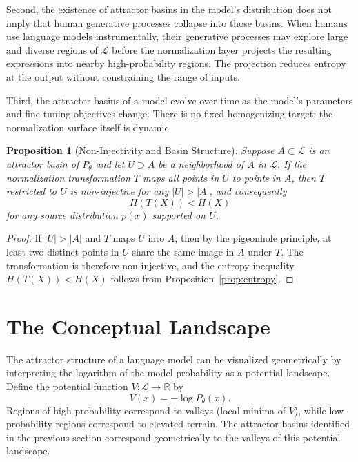 \documentclass[12pt,a4paper]{article}
\theoremstyle{definition}
\theoremstyle{plain}
\newtheorem{proposition}[definition]{Proposition}
\theoremstyle{remark}
\newcommand{\calL}{\mathcal{L}}
\begin{document}
Second, the existence of attractor basins in the model's distribution does not imply that
human generative processes collapse into those basins. When humans use language models
instrumentally, their generative processes may explore large and diverse regions of $\calL$
before the normalization layer projects the resulting expressions into nearby high-probability
regions. The projection reduces entropy at the output without constraining the range of
inputs.

Third, the attractor basins of a model evolve over time as the model's parameters and
fine-tuning objectives change. There is no fixed homogenizing target; the normalization
surface itself is dynamic.

\begin{proposition}[Non-Injectivity and Basin Structure]
Suppose $A \subset \calL$ is an attractor basin of $P_\theta$ and let $U \supset A$ be a
neighborhood of $A$ in $\calL$. If the normalization transformation $T$ maps all points in
$U$ to points in $A$, then $T$ restricted to $U$ is non-injective for any $|U| > |A|$, and
consequently
\[
H(T(X)) < H(X)
\]
for any source distribution $p(x)$ supported on $U$.
\end{proposition}

\begin{proof}
If $|U| > |A|$ and $T$ maps $U$ into $A$, then by the pigeonhole principle, at least two
distinct points in $U$ share the same image in $A$ under $T$. The transformation is therefore
non-injective, and the entropy inequality $H(T(X)) < H(X)$ follows from
Proposition~\ref{prop:entropy}.
\end{proof}

\section{The Conceptual Landscape}
\label{sec:landscape}

The attractor structure of a language model can be visualized geometrically by interpreting
the logarithm of the model probability as a potential landscape. Define the potential function
$V : \calL \to \mathbb{R}$ by
\[
V(x) = -\log P_\theta(x).
\]
Regions of high probability correspond to valleys (local minima of $V$), while low-probability
regions correspond to elevated terrain. The attractor basins identified in the previous
section correspond geometrically to the valleys of this potential landscape.
\end{document}
